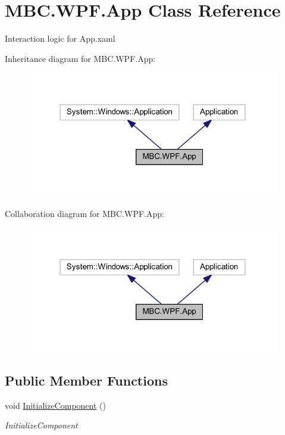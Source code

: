 \hypertarget{class_m_b_c_1_1_w_p_f_1_1_app}{\section{M\-B\-C.\-W\-P\-F.\-App Class Reference}
\label{class_m_b_c_1_1_w_p_f_1_1_app}
}


Interaction logic for App.\-xaml  




Inheritance diagram for M\-B\-C.\-W\-P\-F.\-App\-:
\nopagebreak
\begin{figure}[H]
\begin{center}
\leavevmode
\includegraphics[width=313pt]{class_m_b_c_1_1_w_p_f_1_1_app__inherit__graph}
\end{center}
\end{figure}


Collaboration diagram for M\-B\-C.\-W\-P\-F.\-App\-:
\nopagebreak
\begin{figure}[H]
\begin{center}
\leavevmode
\includegraphics[width=313pt]{class_m_b_c_1_1_w_p_f_1_1_app__coll__graph}
\end{center}
\end{figure}
\subsection*{Public Member Functions}
\begin{DoxyCompactItemize}
\item 
void \hyperlink{class_m_b_c_1_1_w_p_f_1_1_app_a64e84c389e5f4a2e06725318efe701da}{Initialize\-Component} ()
\begin{DoxyCompactList}\small\item\em Initialize\-Component \end{DoxyCompactList}\end{DoxyCompactItemize}
